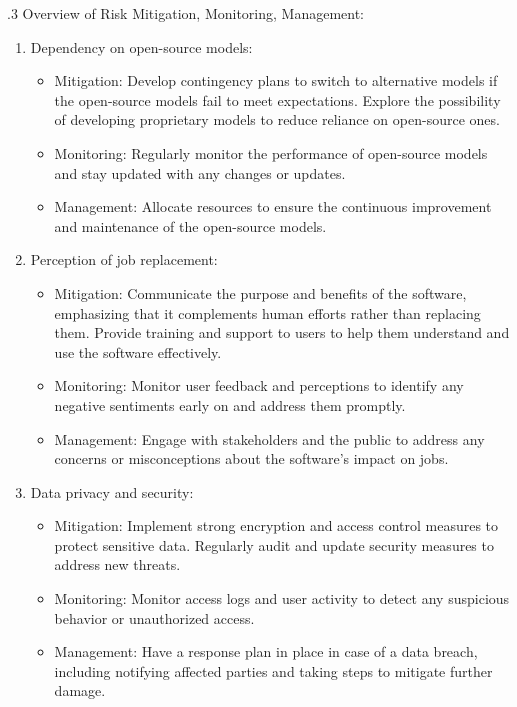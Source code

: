 \documentclass[12pt]{article}
\begin{document}
.3 Overview of Risk Mitigation, Monitoring, Management:
\begin{enumerate}
   
\item Dependency on open-source models:
\begin{itemize}
    \item Mitigation: Develop contingency plans to switch to alternative models if the open-source models fail to meet expectations. Explore the possibility of developing proprietary models to reduce reliance on open-source ones.
    \item Monitoring: Regularly monitor the performance of open-source models and stay updated with any changes or updates.
    \item Management: Allocate resources to ensure the continuous improvement and maintenance of the open-source models.
\end{itemize}

\item Perception of job replacement:
\begin{itemize}
    \item Mitigation: Communicate the purpose and benefits of the software, emphasizing that it complements human efforts rather than replacing them. Provide training and support to users to help them understand and use the software effectively.
    \item Monitoring: Monitor user feedback and perceptions to identify any negative sentiments early on and address them promptly.
    \item Management: Engage with stakeholders and the public to address any concerns or misconceptions about the software's impact on jobs.
\end{itemize}
\bigskip
\item Data privacy and security:
\begin{itemize}
    \item Mitigation: Implement strong encryption and access control measures to protect sensitive data. Regularly audit and update security measures to address new threats.
    \item Monitoring: Monitor access logs and user activity to detect any suspicious behavior or unauthorized access.
    \item Management: Have a response plan in place in case of a data breach, including notifying affected parties and taking steps to mitigate further damage.
\end{itemize}


\end{enumerate}
\end{document}
